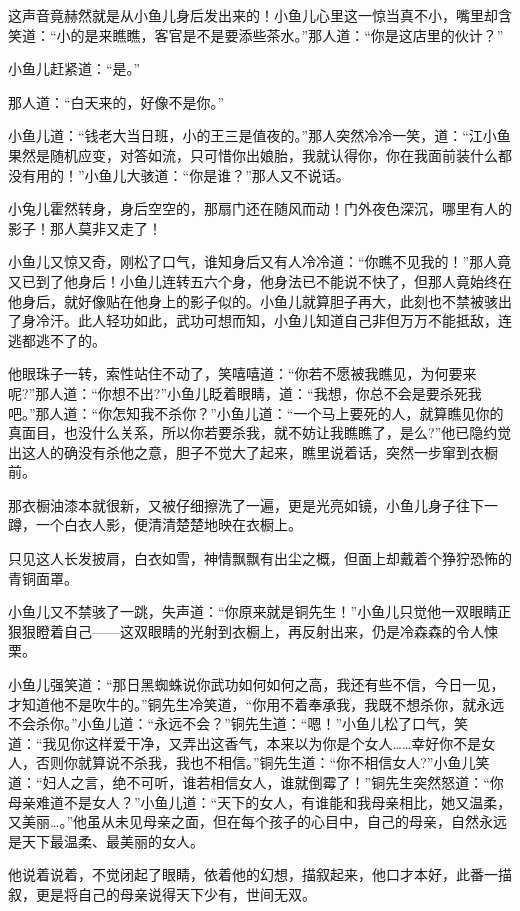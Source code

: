 \documentclass[12pt,oneside]{book}
\begin{document}
这声音竟赫然就是从小鱼儿身后发出来的！小鱼儿心里这一惊当真不小，嘴里却含笑道：``小的是来瞧瞧，客官是不是要添些茶水。''那人道：``你是这店里的伙计？''

小鱼儿赶紧道：``是。''

那人道：``白天来的，好像不是你。''

小鱼儿道：``钱老大当日班，小的王三是值夜的。''那人突然冷冷一笑，道：``江小鱼果然是随机应变，对答如流，只可惜你出娘胎，我就认得你，你在我面前装什么都没有用的！''小鱼儿大骇道：``你是谁？''那人又不说话。

小兔儿霍然转身，身后空空的，那扇门还在随风而动！门外夜色深沉，哪里有人的影子！那人莫非又走了！

小鱼儿又惊又奇，刚松了口气，谁知身后又有人冷冷道：``你瞧不见我的！''那人竟又已到了他身后！小鱼儿连转五六个身，他身法已不能说不快了，但那人竟始终在他身后，就好像贴在他身上的影子似的。小鱼儿就算胆子再大，此刻也不禁被骇出了身冷汗。此人轻功如此，武功可想而知，小鱼儿知道自己非但万万不能抵敌，连逃都逃不了的。

他眼珠子一转，索性站住不动了，笑嘻嘻道：``你若不愿被我瞧见，为何要来呢?''那人道：``你想不出?''小鱼儿眨着眼睛，道：``我想，你总不会是要杀死我吧。''那人道：``你怎知我不杀你？''小鱼儿道：``一个马上要死的人，就算瞧见你的真面目，也没什么关系，所以你若要杀我，就不妨让我瞧瞧了，是么?''他已隐约觉出这人的确没有杀他之意，胆子不觉大了起来，瞧里说着话，突然一步窜到衣橱前。

那衣橱油漆本就很新，又被仔细擦洗了一遍，更是光亮如镜，小鱼儿身子往下一蹲，一个白衣人影，便清清楚楚地映在衣橱上。

只见这人长发披肩，白衣如雪，神情飘飘有出尘之概，但面上却戴着个狰狞恐怖的青铜面罩。

小鱼儿又不禁骇了一跳，失声道：``你原来就是铜先生！''小鱼儿只觉他一双眼睛正狠狠瞪着自己------这双眼睛的光射到衣橱上，再反射出来，仍是冷森森的令人悚栗。

小鱼儿强笑道：``那日黑蜘蛛说你武功如何如何之高，我还有些不信，今日一见，才知道他不是吹牛的。''铜先生冷笑道，``你用不着奉承我，我既不想杀你，就永远不会杀你。''小鱼儿道：``永远不会？''铜先生道：``嗯！''小鱼儿松了口气，笑道：``我见你这样爱干净，又弄出这香气，本来以为你是个女人\ldots\ldots 幸好你不是女人，否则你就算说不杀我，我也不相信。''铜先生道：``你不相信女人?''小鱼儿笑道：``妇人之言，绝不可听，谁若相信女人，谁就倒霉了！''铜先生突然怒道：``你母亲难道不是女人？''小鱼儿道：``天下的女人，有谁能和我母亲相比，她又温柔，又美丽\ldots。''他虽从未见母亲之面，但在每个孩子的心目中，自己的母亲，自然永远是天下最温柔、最美丽的女人。

他说着说着，不觉闭起了眼睛，依着他的幻想，描叙起来，他口才本好，此番一描叙，更是将自己的母亲说得天下少有，世间无双。
\end{document}
